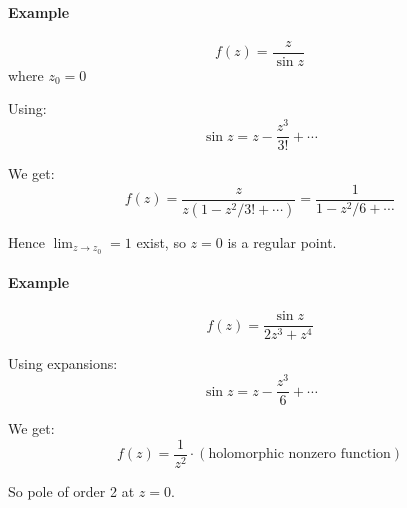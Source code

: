 \paragraph{Example}
\[
f(z) = \frac{z}{\sin z}
\]where $z_0 = 0$

Using:
\[
\sin z = z - \frac{z^3}{3!} + \cdots
\]

We get:
\[
f(z) = \frac{z}{z(1 - z^2/3! + \cdots)} = \frac{1}{1 - z^2/6 + \cdots}
\]

Hence $\lim_{z \to z_0} = 1$ exist, so $z=0$ is a regular point.

\paragraph{Example}
\[
f(z) = \frac{\sin z}{2z^3 + z^4}
\]

Using expansions:
\[
\sin z = z - \frac{z^3}{6} + \cdots
\]

We get:
\[
f(z) = \frac{1}{z^2} \cdot (\text{holomorphic nonzero function})
\]

So pole of order 2 at $z=0$.

